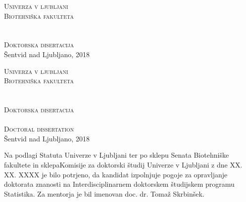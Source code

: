 \begin{titlepage}
\voffset -2cm
\enlargethispage{2cm}
\begin{center}
\Large \textsc{Univerza v ljubljani} \\
\Large \textsc{Biotehniška fakulteta} \\
\vspace{9cm}
\avtor \\
\vspace{1cm}
\LARGE{\platnica}\\
\vspace{0.8cm}
\Large \textsc{Doktorska disertacija}\\
\vspace{8cm} %
\Large Šentvid nad Ljubljano, 2018 \\
\end{center}
\end{titlepage}

\begin{titlepage}
\voffset -2cm
\enlargethispage{2cm}
\begin{center}
\textsc{Univerza v ljubljani}\\
\textsc{Biotehniška fakulteta}\\
\vspace{6cm}
\avtor \\
\vspace{1cm}
\platnica\\
\vspace{0.8cm}
\normalsize\textsc{Doktorska disertacija}\\
\vspace{2cm}
\platnicaEN\\
\vspace{0.8cm}
\normalsize\textsc{Doctoral dissertation}\\
\vspace{7cm} %
Šentvid nad Ljubljano, 2018 \\
\end{center}
\end{titlepage}

\newpage
{}
\setcounter{page}{2}

Na podlagi Statuta Univerze v Ljubljani ter po sklepu Senata Biotehniške fakultete in sklepaKomisije za doktorski študij Univerze v Ljubljani z dne XX. XX. XXXX je bilo potrjeno, da kandidat izpolnjuje pogoje za opravljanje doktorata znanosti na Interdisciplinarnem doktorskem študijskem programu Statistika. Za mentorja je bil imenovan doc. dr. Tomaž Skrbinšek.

